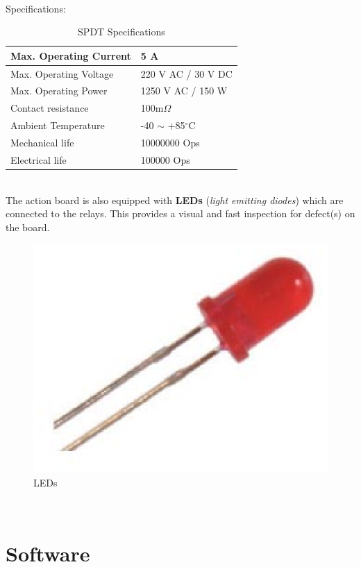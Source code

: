 \documentclass[12pt,a4paper]{report}
\begin{document}
\ \\
Specifications:
\begin{table}[H]
\centering
    \begin{tabular}{|l|l|}
    \hline Max. Operating Current & 5 A \\
    \hline Max. Operating Voltage & 220 V AC / 30 V DC \\
    \hline Max. Operating Power & 1250 V AC / 150 W \\
    \hline Contact resistance & 100m$\Omega$ \\
    \hline Ambient Temperature & -40 $\sim$ +85$^\circ$C \\
    \hline Mechanical life & 10000000 Ops \\
    \hline Electrical life & 100000 Ops \\
    \hline
    \end{tabular}
    \caption{SPDT Specifications}
\end{table}
\ \\
The action board is also equipped with \textbf{LEDs} (\textit{light emitting diodes}) which are connected to the relays. This provides a visual and fast inspection for defect(s) on the board.
\begin{figure}[H]
\centering
    \includegraphics*[scale=0.2]{led}
    \caption{LEDs}
\end{figure}
\ \\
%
\section{Software}
\end{document}

